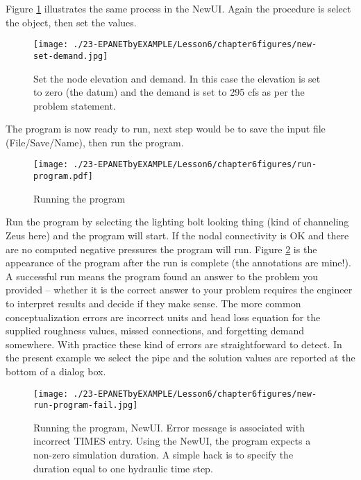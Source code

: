 Figure \ref{fig:new-set-demand} illustrates the same process in the NewUI.   
\newline Again the procedure is select the object, then set the values.
\begin{figure}[h!] %
   \centering
   \texttt{[image: ./23-EPANETbyEXAMPLE/Lesson6/chapter6figures/new-set-demand.jpg]} 
   \caption{Set the node elevation and demand.  In this case the elevation is set to zero (the datum) and the demand is set to 295 cfs as per the problem statement.}
   \label{fig:new-set-demand}
\end{figure}

The program is now ready to run, next step would be to save the input file (File/Save/Name), then run the program.  

\begin{figure}[h!] %
   \centering
   \texttt{[image: ./23-EPANETbyEXAMPLE/Lesson6/chapter6figures/run-program.pdf]} 
   \caption{Running the program}
   \label{fig:run-program}
\end{figure}
Run the program by selecting the lighting bolt looking thing (kind of channeling Zeus here) and the program will start.  If the nodal connectivity is OK and there are no computed negative pressures the program will run.   Figure \ref{fig:run-program}  is the appearance of the program after the run is complete (the annotations are mine!).
A successful run means the program found an answer to the problem you provided -- whether it is the correct answer to your problem requires the engineer to interpret results and decide if they make sense.  The more common conceptualization errors are incorrect units and head loss equation for the supplied roughness values, missed connections, and forgetting demand somewhere.  With practice these kind of errors are straightforward to detect.   In the present example we select the pipe and the solution values are reported at the bottom of a dialog box.

\begin{figure}[h!] %
   \centering
   \texttt{[image: ./23-EPANETbyEXAMPLE/Lesson6/chapter6figures/new-run-program-fail.jpg]} 
   \caption{Running the program, NewUI.  Error message is associated with incorrect TIMES entry.  Using the NewUI, the program expects a non-zero simulation duration.   A simple hack is to specify the duration equal to one hydraulic time step.}
   \label{fig:new-run-program-fail}
\end{figure}

